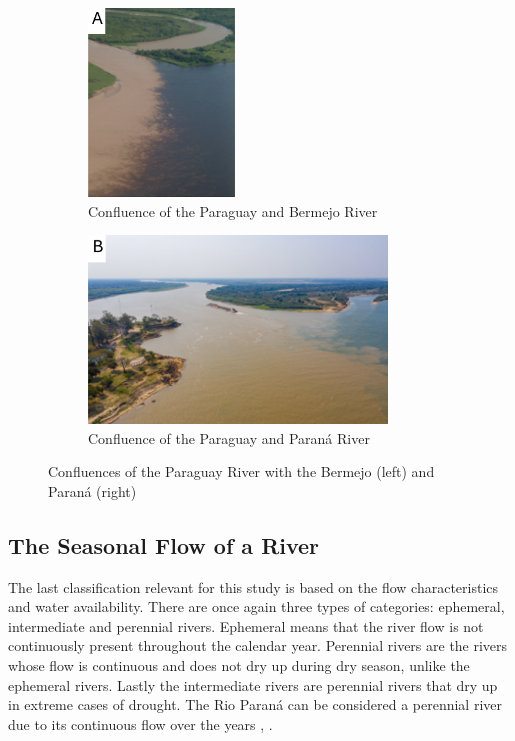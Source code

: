 \begin{figure}[H]
    \centering
    \begin{subfigure}[b]{0.48\textwidth}
        \includegraphics[width=\linewidth, height=5cm]{figures/ch2/Paraguay-Bermejo.png}
        \caption{Confluence of the Paraguay and Bermejo River}
        \label{fig:bermejo}
    \end{subfigure}
    \hfill
    \begin{subfigure}[b]{0.48\textwidth}
        \includegraphics[width=\linewidth, height=5cm]{figures/ch2/Paraguay Parana.png}
        \caption{Confluence of the Paraguay and Paraná River}
        \label{fig:parana}
    \end{subfigure}
    \caption{Confluences of the Paraguay River with the Bermejo (left) and Paraná (right)}
    \label{fig:confluences}
\end{figure}

\subsection{The Seasonal Flow of a River}
The last classification relevant for this study is based on the flow characteristics and water availability. There are once again three types of categories: ephemeral, intermediate and perennial rivers. Ephemeral means that the river flow is not continuously present throughout the calendar year. Perennial rivers are the rivers whose flow is continuous and does not dry up during dry season, unlike the ephemeral rivers. Lastly the intermediate rivers are perennial rivers that dry up in extreme cases of drought.
The Rio Paraná can be considered a perennial river due to its continuous flow over the years \autocite{furchWaterChemistryAmazon1984}, \autocite{sioliAmazonLimnologyLandscape1984}.

